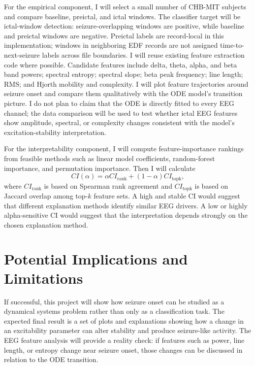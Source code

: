 \documentclass[11pt]{article}
\begin{document}
For the empirical component, I will select a small number of CHB-MIT subjects and compare baseline, preictal, and ictal windows. The classifier target will be ictal-window detection: seizure-overlapping windows are positive, while baseline and preictal windows are negative. Preictal labels are record-local in this implementation; windows in neighboring EDF records are not assigned time-to-next-seizure labels across file boundaries. I will reuse existing feature extraction code where possible. Candidate features include delta, theta, alpha, and beta band powers; spectral entropy; spectral slope; beta peak frequency; line length; RMS; and Hjorth mobility and complexity. I will plot feature trajectories around seizure onset and compare them qualitatively with the ODE model's transition picture. I do not plan to claim that the ODE is directly fitted to every EEG channel; the data comparison will be used to test whether ictal EEG features show amplitude, spectral, or complexity changes consistent with the model's excitation-stability interpretation.

For the interpretability component, I will compute feature-importance rankings from feasible methods such as linear model coefficients, random-forest importance, and permutation importance. Then I will calculate
\begin{equation}
CI(\alpha) = \alpha CI_{\text{rank}} + (1-\alpha)CI_{\text{topk}},
\end{equation}
where \(CI_{\text{rank}}\) is based on Spearman rank agreement and \(CI_{\text{topk}}\) is based on Jaccard overlap among top-\(k\) feature sets. A high and stable CI would suggest that different explanation methods identify similar EEG drivers. A low or highly alpha-sensitive CI would suggest that the interpretation depends strongly on the chosen explanation method.

\section*{Potential Implications and Limitations}

If successful, this project will show how seizure onset can be studied as a dynamical systems problem rather than only as a classification task. The expected final result is a set of plots and explanations showing how a change in an excitability parameter can alter stability and produce seizure-like activity. The EEG feature analysis will provide a reality check: if features such as power, line length, or entropy change near seizure onset, those changes can be discussed in relation to the ODE transition.
\end{document}
